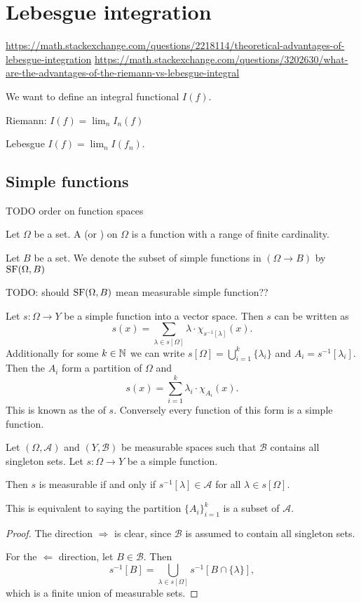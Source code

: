 \section{Lebesgue integration}
\url{https://math.stackexchange.com/questions/2218114/theoretical-advantages-of-lebesgue-integration}
\url{https://math.stackexchange.com/questions/3202630/what-are-the-advantages-of-the-riemann-vs-lebesgue-integral}

We want to define an integral functional $I(f)$.

Riemann: $I(f) = \lim_n I_n(f)$

Lebesgue $I(f) = \lim_n I(f_n)$.


\subsection{Simple functions}
TODO order on function spaces

\begin{definition}
Let $\Omega$ be a set. A  (or ) on $\Omega$ is a function with a range of finite cardinality.

Let $B$ be a set. We denote the subset of simple functions in $(\Omega\to B)$ by $\operatorname{SF}(\Omega,B)$
\end{definition}

TODO: should $\operatorname{SF}(\Omega, B)$ mean measurable simple function??

\begin{lemma}
Let $s:\Omega\to Y$ be a simple function into a vector space. Then $s$ can be written as
\[ s(x) = \sum_{\lambda \in s[\Omega]}\lambda\cdot \chi_{s^{-1}[\lambda]}(x). \]
Additionally for some $k\in\mathbb{N}$ we can write $s[\Omega] = \bigcup_{i=1}^k\{\lambda_i\}$ and $A_i = s^{-1}[\lambda_i]$. Then the $A_i$ form a partition of $\Omega$ and
\[ s(x) = \sum_{i=1}^k\lambda_i\cdot \chi_{A_i}(x). \]
This is known as the  of $s$. Conversely every function of this form is a simple function.
\end{lemma}

\begin{lemma}
Let $(\Omega, \mathcal{A})$ and $(Y, \mathcal{B})$ be measurable spaces such that $\mathcal{B}$ contains all singleton sets. Let $s:\Omega\to Y$ be a simple function.

Then $s$ is measurable \textup{if and only if} $s^{-1}[\lambda]\in\mathcal{A}$ for all $\lambda\in s[\Omega]$.

This is equivalent to saying the partition $\{A_i\}_{i=1}^k$ is a subset of $\mathcal{A}$.
\end{lemma}
\begin{proof}
The direction $\boxed{\Rightarrow}$ is clear, since $\mathcal{B}$ is assumed to contain all singleton sets.

For the $\boxed{\Leftarrow}$ direction, let $B\in \mathcal{B}$. Then
\[ s^{-1}[B] = \bigcup_{\lambda\in s[\Omega]}s^{-1}[B\cap \{\lambda\}], \]
which is a finite union of measurable sets.
\end{proof}

